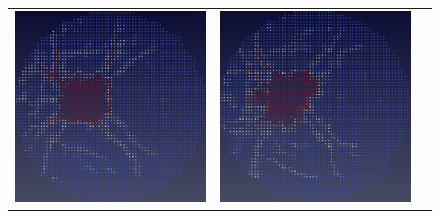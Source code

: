 \begin{figure}
\begin{tabular}{ccc}
  \includegraphics[scale=0.3]{figure/Solutions/solution_2001.eps} &
  \includegraphics[scale=0.3]{figure/Solutions/solution_2002.eps} 
  \end{tabular}

\end{figure}
